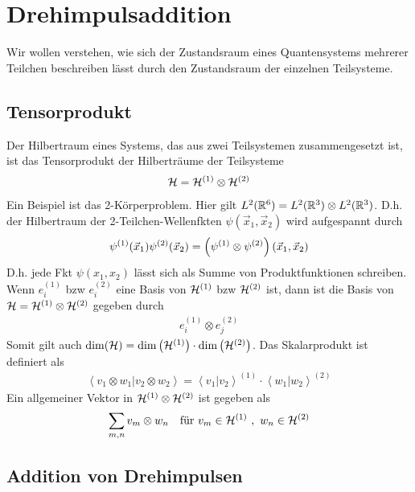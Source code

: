 \section{Drehimpulsaddition}

Wir wollen verstehen, wie sich der Zustandsraum eines Quantensystems mehrerer
Teilchen beschreiben lässt durch den Zustandsraum der einzelnen Teilsysteme.

\subsection{Tensorprodukt}

Der Hilbertraum eines Systems, das aus zwei Teilsystemen zusammengesetzt ist, ist
das Tensorprodukt der Hilberträume der Teilsysteme
\begin{align*}
    \mathcal{H} = \mathcal{H}^{(1)} \otimes \mathcal{H}^{(2)}
\end{align*}
Ein Beispiel ist das 2-Körperproblem. Hier gilt $L^2(\mathbb{R}^6) = L^2(\mathbb{R}^3) \otimes
L^2(\mathbb{R}^3)$. D.h. der Hilbertraum der 2-Teilchen-Wellenfkten $\psi(\vec{x}_1,\vec{x}_2)$
wird aufgespannt durch
\begin{align*}
    \psi^{(1)} (\vec{x}_1) \psi^{(2)}(\vec{x}_2) = \left( \psi^{(1)} \otimes
    \psi^{(2)} \right) \left( \vec{x}_1 , \vec{x}_2 \right)
\end{align*}
D.h. jede Fkt $\psi(x_1,x_2)$ lässt sich als Summe von Produktfunktionen schreiben.
Wenn $e_i^{(1)}$ bzw $e_i^{(2)}$ eine Basis von $\mathcal{H}^{(1)}$ bzw $\mathcal{H}^{(2)}$ ist,
dann ist die Basis von $\mathcal{H} = \mathcal{H}^{(1)} \otimes \mathcal{H}^{(2)}$ gegeben durch
\begin{align*}
    e_i^{(1)} \otimes e_j^{(2)}
\end{align*}
Somit gilt auch $\dim(\mathcal{H}) = \dim \left( \mathcal{H}^{(1)} \right) \cdot \dim \left( \mathcal{H}^{(2)} \right)$.
Das Skalarprodukt ist definiert als
\begin{align*}
    \left\langle v_1 \otimes w_1 | v_2 \otimes w_2 \right\rangle
    = \left\langle v_1 | v_2 \right\rangle^{(1)} \cdot
        \left\langle w_1 | w_2 \right\rangle^{(2)}
\end{align*}
Ein allgemeiner Vektor in $\mathcal{H}^{(1)} \otimes \mathcal{H}^{(2)}$ ist gegeben als
\begin{align*}
    \sum_{m,n} v_m \otimes w_n
    \hspace{10pt} \text{für } v_m \in \mathcal{H}^{(1)} \ , \ w_n \in \mathcal{H}^{(2)}
\end{align*}

\subsection{Addition von Drehimpulsen}

